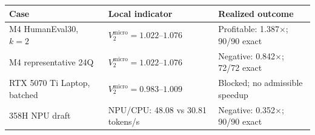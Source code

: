 \setlength{\tabcolsep}{5pt}
\renewcommand{\arraystretch}{1.2}
\begin{tabularx}{\linewidth}{@{}p{1.84in}p{2.30in}X@{}}
\toprule
Case & Local indicator & Realized outcome \\
\midrule
M4 HumanEval30, $k=2$ & $V_2^{\mathrm{micro}}=1.022$--$1.076$ & Profitable: 1.387$\times$; 90/90 exact \\
M4 representative 24Q & $V_2^{\mathrm{micro}}=1.022$--$1.076$ & Negative: 0.842$\times$; 72/72 exact \\
RTX 5070 Ti Laptop, batched & $V_2^{\mathrm{micro}}=0.983$--$1.009$ & Blocked; no admissible speedup \\
358H NPU draft & NPU/CPU: 48.08 vs 30.81 tokens/s & Negative: 0.352$\times$; 90/90 exact \\
\bottomrule
\end{tabularx}

